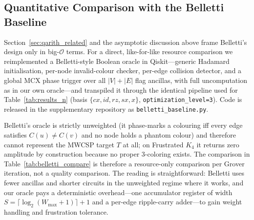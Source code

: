 \documentclass{ieeeaccess}
\begin{document}
\subsection{Quantitative Comparison with the Belletti Baseline}
\label{sec:belletti_quant}

Section~\ref{sec:qarith_related} and the asymptotic discussion above frame Belletti's design only in big-$\mathcal{O}$ terms. For a direct, like-for-like resource comparison we reimplemented a Belletti-style Boolean oracle in Qiskit---generic Hadamard initialisation, per-node invalid-colour checker, per-edge collision detector, and a global MCX phase trigger over all $|V|+|E|$ flag ancillas, with full uncomputation as in our own oracle---and transpiled it through the identical pipeline used for Table~\ref{tab:results_n} (basis $\{cx, id, rz, sx, x\}$, \texttt{optimization\_level=3}). Code is released in the supplementary repository as \texttt{belletti\_baseline.py}.

Belletti's oracle is strictly unweighted (it phase-marks a colouring iff every edge satisfies $C(u) \ne C(v)$ and no node holds a phantom colour) and therefore cannot represent the MWCSP target $T$ at all; on Frustrated $K_4$ it returns zero amplitude by construction because no proper $3$-coloring exists. The comparison in Table~\ref{tab:belletti_compare} is therefore a resource-only comparison per Grover iteration, not a quality comparison. The reading is straightforward: Belletti uses fewer ancillas and shorter circuits in the unweighted regime where it works, and our oracle pays a deterministic overhead---one accumulator register of width $S = \lceil \log_2(W_{\max}+1) \rceil + 1$ and a per-edge ripple-carry adder---to gain weight handling and frustration tolerance.

\begin{table}[htbp]
\caption{Belletti unweighted baseline vs.\ MSB-Overflow (Min Width), per Grover iteration. Both circuits transpiled through Qiskit \texttt{optimization\_level=3} on the same basis gate set. Belletti's oracle phase-marks only proper colourings and is incapable of representing weights or returning non-zero amplitude on Frustrated $K_4$; the columns therefore report resource consumption only.}
\label{tab:belletti_compare}
\centering
{}
\end{table}
\end{document}
